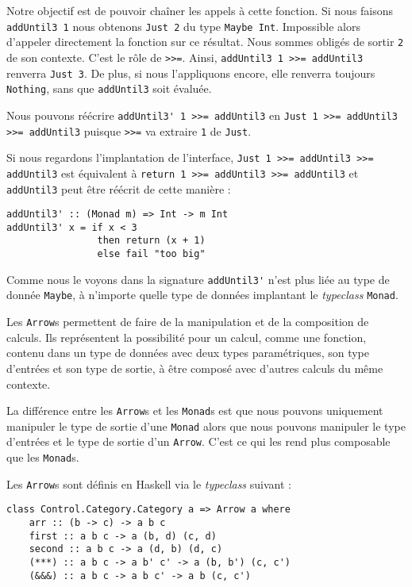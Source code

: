 \documentclass{llncs}
\newcommand{\Arrp}{\lstinline{Arrow}. }
\newcommand{\Arrs}{\lstinline{Arrow}s }
\begin{document}
Notre objectif est de pouvoir chaîner les appels à cette fonction.
Si nous faisons \lstinline{addUntil3 1} nous obtenons \lstinline{Just 2} du type \lstinline{Maybe Int}.
Impossible alors d'appeler directement la fonction sur ce résultat.
Nous sommes obligés de sortir \lstinline{2} de son contexte.
C'est le rôle de \lstinline{>>=}.
Ainsi, \lstinline{addUntil3 1 >>= addUntil3} renverra \lstinline{Just 3}.
De plus, si nous l'appliquons encore, elle renverra toujours \lstinline{Nothing},
sans que \lstinline{addUntil3} soit évaluée.

Nous pouvons réécrire \lstinline{addUntil3' 1 >>= addUntil3} en \lstinline{Just 1 >>= addUntil3 >>= addUntil3}
puisque \lstinline{>>=} va extraire \lstinline{1} de \lstinline{Just}.

Si nous regardons l'implantation de l'interface, \lstinline{Just 1 >>= addUntil3 >>= addUntil3}
est équivalent à \lstinline{return 1 >>= addUntil3 >>= addUntil3} et \lstinline{addUntil3}
peut être réécrit de cette manière :
\begin{lstlisting}
addUntil3' :: (Monad m) => Int -> m Int
addUntil3' x = if x < 3
                then return (x + 1)
                else fail "too big"
\end{lstlisting}

Comme nous le voyons dans la signature \lstinline{addUntil3'} n'est plus liée au type
de donnée \lstinline{Maybe}, à n'importe quelle type de données implantant le \emph{typeclass}
\lstinline{Monad}.

Les \Arrs permettent de faire de la manipulation et de la composition de calculs.
Ils représentent la possibilité pour un calcul, comme une fonction, contenu dans un
type de données avec deux types paramétriques, son type d'entrées et son type de sortie,
à être composé avec d'autres calculs du même contexte.

La différence entre les \Arrs et les \lstinline{Monad}s est que nous pouvons
uniquement manipuler le type de sortie d'une \lstinline{Monad} alors que nous pouvons
manipuler le type d'entrées et le type de sortie d'un \Arrp
C'est ce qui les rend plus composable que les \lstinline{Monad}s.

Les \Arrs sont définis en Haskell via le \emph{typeclass} suivant :
\begin{lstlisting}
class Control.Category.Category a => Arrow a where
    arr :: (b -> c) -> a b c
    first :: a b c -> a (b, d) (c, d)
    second :: a b c -> a (d, b) (d, c)
    (***) :: a b c -> a b' c' -> a (b, b') (c, c')
    (&&&) :: a b c -> a b c' -> a b (c, c')
\end{lstlisting}
\end{document}
